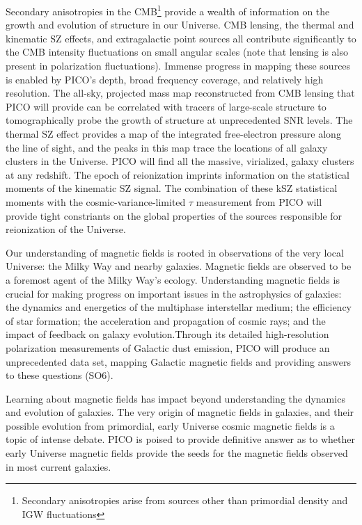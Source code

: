\documentclass[PICOReport.tex]{subfiles}
\begin{document}
Secondary anisotropies in the CMB\footnote{Secondary anisotropies arise from sources other than primordial density and \ac{IGW} fluctuations} provide a wealth of information on the growth and evolution of structure in our Universe. CMB lensing, the thermal and kinematic \ac{SZ} effects, and extragalactic point sources all contribute significantly to the CMB intensity fluctuations on small angular scales (note that lensing is also present in polarization fluctuations). Immense progress in mapping these sources is enabled by PICO's depth, broad frequency coverage, and relatively high resolution. The all-sky, projected mass map reconstructed from CMB lensing that PICO will provide can be correlated with tracers of large-scale structure to tomographically probe the growth of structure at unprecedented \ac{SNR} levels. The thermal SZ effect provides a map of the integrated free-electron pressure along the line of sight, and the peaks in this map trace the locations of all galaxy clusters in the Universe. PICO will find all the massive, virialized, galaxy clusters at any redshift.  The epoch of reionization imprints information on the statistical moments of the kinematic SZ signal. The combination of these kSZ statistical moments with the cosmic-variance-limited $\tau$ measurement from PICO will provide tight constriants on the global properties of the sources responsible for reionization of the Universe.

Our understanding of magnetic fields is rooted in observations of the very local Universe: the Milky Way and nearby galaxies. Magnetic fields are observed to be a foremost agent of the Milky Way's ecology. Understanding magnetic fields is crucial for making progress on important issues in the astrophysics of galaxies: the dynamics and energetics of the multiphase interstellar medium; the efficiency of star formation; the acceleration and propagation of cosmic rays; and the impact of feedback on galaxy evolution.Through its detailed high-resolution polarization measurements of Galactic dust emission, PICO will produce an unprecedented data set, mapping Galactic magnetic fields and providing answers to these questions (SO6). 

Learning about magnetic fields has impact beyond understanding the dynamics and evolution of galaxies. The very origin of magnetic fields in galaxies, and their possible evolution from primordial, early Universe cosmic magnetic fields is a topic of intense debate. PICO is poised to provide definitive answer as to whether early Universe magnetic fields provide the seeds for the magnetic fields observed in most current galaxies. 
\end{document}
